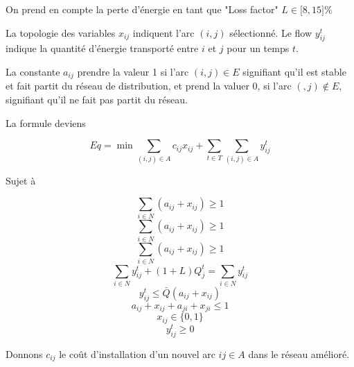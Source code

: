 On prend en compte la perte d'énergie en tant que "Loss factor" $L \in \lbrack 8, 15 \rbrack \%$

La topologie des variables $x_{ij}$ indiquent l'arc $(i, j)$ sélectionné.
Le flow $y^t_{ij}$ indique la quantité d'énergie transporté entre $i$ et $j$ pour un temps $t$.

La constante $a_{ij}$ prendre la valeur 1 si l'arc $(i,j) \in E$ signifiant qu'il est stable et
fait partit du réseau de distribution, et prend la valuer 0, si l'arc $(,j) \notin E$, signifiant
qu'il ne fait pas partit du réseau.

La formule deviens

\begin{equation} \label{prosumer_1}
  Eq = \min \sum_{(i, j) \in A} c_{ij} x_{ij} + \sum_{t \in T} \sum_{(i,j) \in A} y^t_{ij}
\end{equation}

Sujet à

\begin{equation} \label{prosumer_2}
  \sum_{i \in N} (a_{ij} + x_{ij}) \ge 1
\end{equation}
\begin{equation} \label{prosumer_3}
  \sum_{i \in N} (a_{ij} + x_{ij}) \ge 1
\end{equation}
\begin{equation} \label{prosumer_4}
  \sum_{i \in N} (a_{ij} + x_{ij}) \ge 1
\end{equation}
\begin{equation} \label{prosumer_5}
  \sum_{i \in N} y^t_{ij} + (1 + L) Q^t_j = \sum_{i \in N} y^t_{ij}
\end{equation}
\begin{equation} \label{prosumer_6}
  y^t_{ij} \le \bar{Q}(a_{ij} + x_{ij})
\end{equation}
\begin{equation} \label{prosumer_7}
  a_{ij} + x_{ij} + a_{ji} + x_{ji} \le 1
\end{equation}
\begin{equation} \label{prosumer_8}
  x_{ij} \in \lbrace 0, 1 \rbrace
\end{equation}
\begin{equation} \label{prosumer_9}
  y^t_{ij} \ge 0
\end{equation}

Donnons $c_{ij}$ le coût d'installation d'un nouvel arc $ij \in A$ dans
le réseau amélioré.

